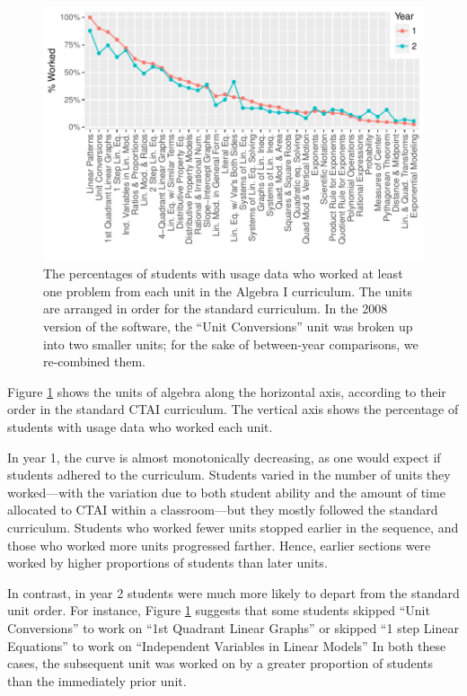 \documentclass[12pt]{article}\usepackage[]{graphicx}\usepackage[]{color}
\makeatletter
\def\maxwidth{ %
  \ifdim\Gin@nat@width>\linewidth
    \linewidth
  \else
    \Gin@nat@width
  \fi
}
\makeatother
\begin{document}
\begin{figure}
  \centering

\includegraphics[width=\maxwidth]{figure/whichUnits-1} 

\caption{The percentages of students with usage data who worked at
  least one problem from each unit in the Algebra I curriculum. The
  units are arranged in order for the standard curriculum. In the 2008
version of the software, the ``Unit Conversions'' unit was broken up
into two smaller units; for the sake of between-year comparisons, we
re-combined them.}
\label{fig:unitsWorked}
\end{figure}


Figure \ref{fig:unitsWorked} shows the units of algebra along the
horizontal axis, according to their order in the standard CTAI
curriculum.
The vertical axis shows the percentage of students with usage data who
worked each unit.

In year 1, the curve is almost monotonically decreasing, as one would
expect if students adhered to the curriculum.
Students varied in the number of units they worked---with the variation due
to both student ability and the amount of time allocated to CTAI
within a classroom---but they mostly followed the standard curriculum.
Students who worked fewer units stopped earlier in the sequence, and those who worked more units progressed farther.
Hence, earlier sections were worked by higher proportions of students
than later units.

In contrast, in year 2 students were much more likely to depart from the
standard unit order.
For instance, Figure \ref{fig:unitsWorked} suggests that some students
skipped ``Unit Conversions'' to work on  ``1st
Quadrant Linear Graphs'' or skipped ``1 step Linear Equations'' to work on ``Independent Variables in Linear Models''
In both these cases, the subsequent unit was worked on by a greater
proportion of students than the immediately prior unit.
\end{document}
